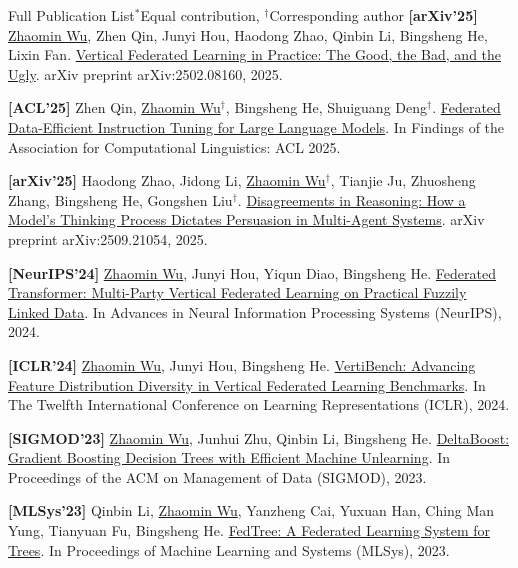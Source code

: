 \begin{rSectionTiny}{Full Publication List}{\(^*\)Equal contribution, \(^\dagger\)Corresponding author}
        {\bf [arXiv'25]} \underline{Zhaomin Wu}, Zhen Qin, Junyi Hou, Haodong Zhao, Qinbin Li, Bingsheng He, Lixin Fan. \href{https://arxiv.org/pdf/2502.08160}{Vertical Federated Learning in Practice: The Good, the Bad, and the Ugly}. arXiv preprint arXiv:2502.08160, 2025.

        {\bf [ACL'25]} Zhen Qin, \underline{Zhaomin Wu}\(^\dagger\), Bingsheng He, Shuiguang Deng\(^\dagger\). \href{https://aclanthology.org/2025.findings-acl.803/}{Federated Data-Efficient Instruction Tuning for Large Language Models}. In Findings of the Association for Computational Linguistics: ACL 2025.

        {\bf [arXiv'25]} Haodong Zhao, Jidong Li, \underline{Zhaomin Wu}\(^\dagger\), Tianjie Ju, Zhuosheng Zhang, Bingsheng He, Gongshen Liu\(^\dagger\). \href{https://arxiv.org/pdf/2509.21054}{Disagreements in Reasoning: How a Model's Thinking Process Dictates Persuasion in Multi-Agent Systems}. arXiv preprint arXiv:2509.21054, 2025.


    {\bf [NeurIPS'24]} \underline{Zhaomin Wu}, Junyi Hou, Yiqun Diao, Bingsheng He. \href{https://openreview.net/forum?id=FqWyzyErVT}{Federated Transformer: Multi-Party Vertical Federated Learning on Practical Fuzzily Linked Data}. In Advances in Neural Information Processing Systems (NeurIPS), 2024.

        {\bf [ICLR'24]} \underline{Zhaomin Wu}, Junyi Hou, Bingsheng He. \href{https://openreview.net/forum?id=glwwbaeKm2}{VertiBench: Advancing Feature Distribution Diversity in Vertical Federated Learning Benchmarks}. In The Twelfth International Conference on Learning Representations (ICLR), 2024.


    {\bf [SIGMOD'23]} \underline{Zhaomin Wu}, Junhui Zhu, Qinbin Li, Bingsheng He. \href{https://doi.org/10.1145/3589313}{DeltaBoost: Gradient Boosting Decision Trees with Efficient Machine Unlearning}. In Proceedings of the ACM on Management of Data (SIGMOD), 2023. 

    {\bf [MLSys'23]} Qinbin Li, \underline{Zhaomin Wu}, Yanzheng Cai, Yuxuan Han, Ching Man Yung, Tianyuan Fu, Bingsheng He. \href{https://proceedings.mlsys.org/paper_files/paper/2023/file/3430e7055936cb8e26451ed49fce84a6-Paper-mlsys2023.pdf}{FedTree: A Federated Learning System for Trees}. In Proceedings of Machine Learning and Systems (MLSys), 2023.


\end{rSectionTiny}
